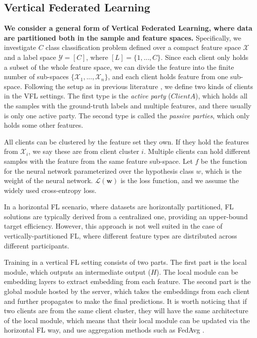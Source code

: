 \documentclass[withindex,glossary,firstyr]{cam-thesis}
\begin{document}
\subsection{Vertical Federated Learning} \label{sec:problem_setup}
\textbf{We consider a general form of Vertical Federated Learning, where data are partitioned both in the sample and feature spaces.}
Specifically, we investigate $C$ class classification problem defined over a compact feature space $\mathcal{X}$ and a label space $\mathcal{Y} = [C]$, where $[L] = \{ 1,...,C \}$. Since each client only holds a subset of the whole feature space, we can divide the feature into the finite number of sub-spaces $\{\mathcal{X}_1,...,\mathcal{X}_n \}$, and each client holds feature from one sub-space. Following the setup as in previous literature \citep{vfl}, we define two kinds of clients in the VFL settings. The first type is the \emph{active party} ($Client A$), which holds all the samples with the ground-truth labels and multiple features, and there usually is only one active party. The second type is called the \emph{passive parties}, which only holds some other features.  

All clients can be clustered by the feature set they own. If they hold the features from $\mathcal{X}_i$, we say these are from client cluster $i$. Multiple clients can hold different samples with the feature from the same feature sub-space. 
Let $f$ be the function for the neural network parameterized over the hypothesis class $w$, which is the weight of the neural network. $\mathcal{L}(\textbf{w})$ is the loss function, and we assume the widely used cross-entropy loss.

In a horizontal FL scenario, where datasets are horizontally partitioned, FL solutions are typically derived from a centralized one, providing an upper-bound target efficiency. However, this approach is not well suited in the case of vertically-partitioned FL, where different feature types are distributed across different participants.

Training in a vertical FL setting consists of two parts. The first part is the local module, which outputs an intermediate output ($H$). The local module can be embedding layers to extract embedding from each feature. The second part is the global module hosted by the server, which takes the embeddings from each client and further propagates to make the final predictions. It is worth noticing that if two clients are from the same client cluster, they will have the same architecture of the local module, which means that their local module can be updated via the horizontal FL way, and use aggregation methods such as FedAvg \citep{fedavg}. 
\end{document}
